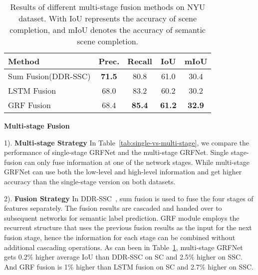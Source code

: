\documentclass[10pt,twocolumn,letterpaper]{article}
\begin{document}
\begin{table}[t]
\begin{center}
\scalebox {0.95}
{
\begin{tabular} {l|ccc|c} 
\hline
Method 				                    & Prec. & Recall & IoU & mIoU \\ \hline
Sum Fusion(DDR-SSC)   & {\bfseries71.5}  & 80.8  & 61.0 & 30.4\\
LSTM Fusion 	                        & 68.0  & 83.2  & 60.2 &  30.2\\   
GRF Fusion 	                            & 68.4  & {\bfseries85.4}  & {\bfseries61.2} & {\bfseries32.9} \\ 
\hline
\end{tabular}
}
\end{center}
\caption{Results of different multi-stage fusion methods on NYU dataset. With IoU represents the accuracy of scene completion, and mIoU denotes the accuracy of semantic scene completion.}
\label{tab:multifusion}
\vspace{-0.4cm}
\end{table}




\noindent
\textbf{Multi-stage Fusion}


1). 
\textbf{Multi-stage Strategy}
In Table~\ref{tab:single-vs-multi-stage}, we compare the performance of single-stage GRFNet and the multi-stage GRFNet. 
Single stage-fusion can only fuse information at one of the network stages.
While multi-stage GRFNet can use both the low-level and high-level information and get higher accuracy than the single-stage version on both datasets.

2).
\textbf{Fusion Strategy}
In DDR-SSC~\cite{li2019rgbd}, sum fusion is used to fuse the four stages of features separately. 
The fusion results are cascaded and handed over to subsequent networks for semantic label prediction.
GRF module employs the recurrent structure that uses the previous fusion results as the input for the next fusion stage, hence the information for each stage can be combined without additional cascading operations.
As can been in Table~\ref{tab:multifusion}, multi-stage GRFNet gets 0.2\% higher average IoU than DDR-SSC on SC and 2.5\% higher on SSC. And GRF fusion is 1\% higher than LSTM fusion on SC and 2.7\% higher on SSC.
\end{document}
